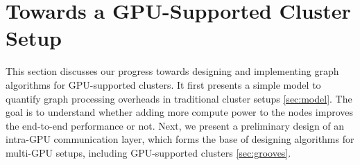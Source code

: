 \documentclass{acm_proc_article-sp}[12pt]
\begin{document}



\section{Towards a GPU-Supported Cluster Setup}
\label{sec:cluster}
This section discusses our progress towards designing and implementing graph algorithms for GPU-supported clusters. It first presents a simple model to quantify graph processing overheads in traditional cluster setups \ref{sec:model}. The goal is to understand whether adding more compute power to the nodes improves the end-to-end performance or not. Next, we present a preliminary design of an intra-GPU communication layer, which forms the base of designing algorithms for multi-GPU setups, including GPU-supported clusters \ref{sec:grooves}.








\end{document}
